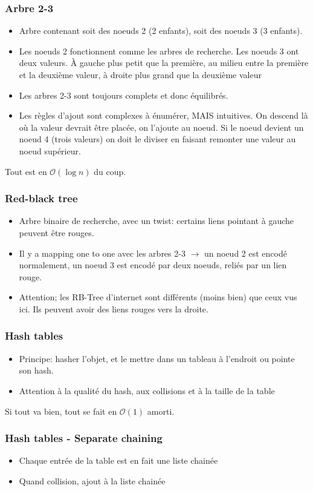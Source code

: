 \documentclass[8pt,aspectratio=169]{beamer}
\begin{document}
\begin{frame}
\frametitle{Arbre 2-3}
\begin{itemize}
	\item Arbre contenant soit des noeuds 2 (2 enfants), soit des noeuds 3 (3 enfants).
	\item Les noeuds 2 fonctionnent comme les arbres de recherche. Les noeuds 3 ont deux valeurs. À gauche plus petit que la première, au milieu entre la première et la deuxième valeur, à droite plus grand que la deuxième valeur
	\item Les arbres 2-3 sont toujours complets et donc équilibrés.
	\item Les règles d'ajout sont complexes à énumérer, MAIS intuitives. On descend là où la valeur devrait être placée, on l'ajoute au noeud. Si le noeud devient un noeud 4 (trois valeurs) on doit le diviser en faisant remonter une valeur au noeud supérieur.
\end{itemize}
Tout est en $\mathcal{O}(\log n)$ du coup.
\end{frame}

\begin{frame}
\frametitle{Red-black tree}
\begin{itemize}
	\item Arbre binaire de recherche, avec un twist: certains liens pointant à gauche peuvent être rouges.
	\item Il y a mapping one to one avec les arbres 2-3 $\rightarrow$ un noeud 2 est encodé normalement, un noeud 3 est encodé par deux noeuds, reliés par un lien rouge.
	\item Attention; les RB-Tree d'internet sont différents (moins bien) que ceux vus ici. Ils peuvent avoir des liens rouges vers la droite.
\end{itemize}
\end{frame}

\begin{frame}
\frametitle{Hash tables}
\begin{itemize}
	\item Principe: hasher l'objet, et le mettre dans un tableau à l'endroit ou pointe son hash.
	\item Attention à la qualité du hash, aux collisions et à la taille de la table
\end{itemize}
Si tout va bien, tout se fait en $\mathcal{O}(1)$ amorti.
\end{frame}

\begin{frame}
\frametitle{Hash tables - Separate chaining}
\begin{itemize}
	\item Chaque entrée de la table est en fait une liste chainée
	\item Quand collision, ajout à la liste chainée
\end{itemize}
\end{frame}
\end{document}
